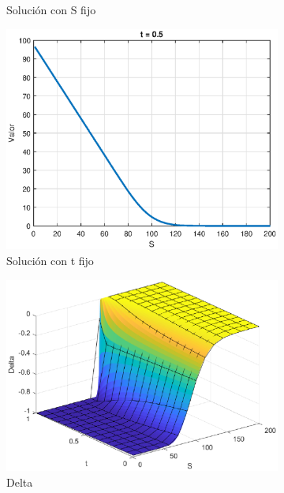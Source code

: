 \begin{figure}[H]
\begin{subfigure}[b]{0.35\linewidth}
        \caption{Solución con S fijo}
    \end{subfigure}
    \begin{subfigure}[b]{0.35\linewidth}
        \includegraphics[width=\linewidth]{Imagenes/Parte1/6_Sols/Put/PuttFIjo.eps}
        \caption{Solución con t fijo}
    \end{subfigure}
    \begin{subfigure}[b]{0.35\linewidth}
        \includegraphics[width=\linewidth]{Imagenes/Parte1/6_Sols/Put/Put_Delta.eps}
        \caption{Delta}
    \end{subfigure}
    \begin{subfigure}[b]{0.35\linewidth}

\end{subfigure}
\end{figure}
